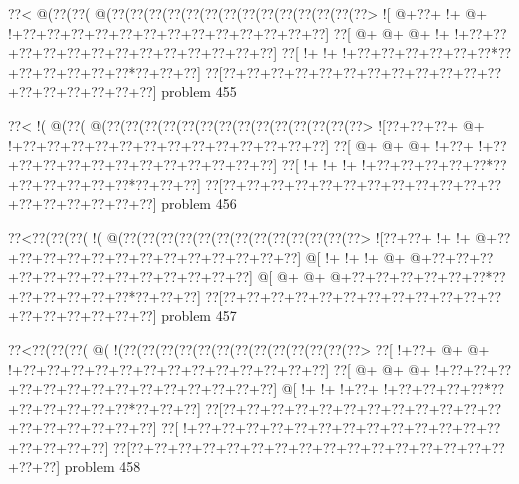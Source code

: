 \vbox{\vbox{\goo
\0??<\- @(\0??(\0??(\- @(\0??(\0??(\0??(\0??(\0??(\0??(\0??(\0??(\0??(\0??(\0??(\0??(\0??(\0??>
\- ![\- @+\0??+\- !+\- @+\- !+\0??+\0??+\0??+\0??+\0??+\0??+\0??+\0??+\0??+\0??+\0??+\0??+\0??]
\0??[\- @+\- @+\- @+\- !+\- !+\0??+\0??+\0??+\0??+\0??+\0??+\0??+\0??+\0??+\0??+\0??+\0??+\0??]
\0??[\- !+\- !+\- !+\0??+\0??+\0??+\0??+\0??+\0??*\0??+\0??+\0??+\0??+\0??+\0??*\0??+\0??+\0??]
\0??[\0??+\0??+\0??+\0??+\0??+\0??+\0??+\0??+\0??+\0??+\0??+\0??+\0??+\0??+\0??+\0??+\0??+\0??]
}
\hfil problem 455\hfil\break
}



\vbox{\vbox{\goo
\0??<\- !(\- @(\0??(\- @(\0??(\0??(\0??(\0??(\0??(\0??(\0??(\0??(\0??(\0??(\0??(\0??(\0??(\0??>
\- ![\0??+\0??+\0??+\- @+\- !+\0??+\0??+\0??+\0??+\0??+\0??+\0??+\0??+\0??+\0??+\0??+\0??+\0??]
\0??[\- @+\- @+\- @+\- !+\0??+\- !+\0??+\0??+\0??+\0??+\0??+\0??+\0??+\0??+\0??+\0??+\0??+\0??]
\0??[\- !+\- !+\- !+\- !+\0??+\0??+\0??+\0??+\0??*\0??+\0??+\0??+\0??+\0??+\0??*\0??+\0??+\0??]
\0??[\0??+\0??+\0??+\0??+\0??+\0??+\0??+\0??+\0??+\0??+\0??+\0??+\0??+\0??+\0??+\0??+\0??+\0??]
}
\hfil problem 456\hfil\break
}



\vbox{\vbox{\goo
\0??<\0??(\0??(\0??(\- !(\- @(\0??(\0??(\0??(\0??(\0??(\0??(\0??(\0??(\0??(\0??(\0??(\0??(\0??>
\- ![\0??+\0??+\- !+\- !+\- @+\0??+\0??+\0??+\0??+\0??+\0??+\0??+\0??+\0??+\0??+\0??+\0??+\0??]
\- @[\- !+\- !+\- !+\- @+\- @+\0??+\0??+\0??+\0??+\0??+\0??+\0??+\0??+\0??+\0??+\0??+\0??+\0??]
\- @[\- @+\- @+\- @+\0??+\0??+\0??+\0??+\0??+\0??*\0??+\0??+\0??+\0??+\0??+\0??*\0??+\0??+\0??]
\0??[\0??+\0??+\0??+\0??+\0??+\0??+\0??+\0??+\0??+\0??+\0??+\0??+\0??+\0??+\0??+\0??+\0??+\0??]
}
\hfil problem 457\hfil\break
}



\vbox{\vbox{\goo
\0??<\0??(\0??(\0??(\- @(\- !(\0??(\0??(\0??(\0??(\0??(\0??(\0??(\0??(\0??(\0??(\0??(\0??(\0??>
\0??[\- !+\0??+\- @+\- @+\- !+\0??+\0??+\0??+\0??+\0??+\0??+\0??+\0??+\0??+\0??+\0??+\0??+\0??]
\0??[\- @+\- @+\- @+\- !+\0??+\0??+\0??+\0??+\0??+\0??+\0??+\0??+\0??+\0??+\0??+\0??+\0??+\0??]
\- @[\- !+\- !+\- !+\0??+\- !+\0??+\0??+\0??+\0??*\0??+\0??+\0??+\0??+\0??+\0??*\0??+\0??+\0??]
\0??[\0??+\0??+\0??+\0??+\0??+\0??+\0??+\0??+\0??+\0??+\0??+\0??+\0??+\0??+\0??+\0??+\0??+\0??]
\0??[\- !+\0??+\0??+\0??+\0??+\0??+\0??+\0??+\0??+\0??+\0??+\0??+\0??+\0??+\0??+\0??+\0??+\0??]
\0??[\0??+\0??+\0??+\0??+\0??+\0??+\0??+\0??+\0??+\0??+\0??+\0??+\0??+\0??+\0??+\0??+\0??+\0??]
}
\hfil problem 458\hfil\break
}



